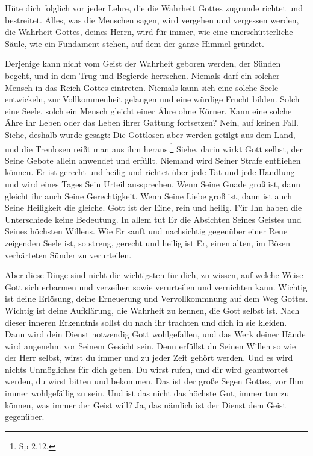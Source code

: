 Hüte dich folglich vor jeder Lehre, die die Wahrheit Gottes zugrunde richtet und bestreitet. Alles, was die Menschen sagen, wird vergehen und vergessen werden, die Wahrheit Gottes, deines Herrn, wird für immer, wie eine unerschütterliche Säule, wie ein Fundament stehen, auf dem der ganze Himmel gründet. 

Derjenige kann nicht vom Geist der Wahrheit geboren werden, der Sünden begeht, und in dem Trug und Begierde herrschen. Niemals darf ein solcher Mensch in das Reich Gottes eintreten. Niemals kann sich eine solche Seele entwickeln, zur Vollkommenheit gelangen und eine würdige Frucht bilden. Solch eine Seele, solch ein Mensch gleicht einer Ähre ohne Körner. Kann eine solche Ähre ihr Leben oder das Leben ihrer Gattung fortsetzen? Nein, auf keinen Fall. Siehe, deshalb wurde gesagt: Die Gottlosen aber werden getilgt aus dem Land, und die Treulosen reißt man aus ihm heraus.\footnote{Sp 2,12.} Siehe, darin wirkt Gott selbst, der Seine Gebote allein anwendet und erfüllt. Niemand wird Seiner Strafe entfliehen können. Er ist gerecht und heilig und richtet über jede Tat und jede Handlung und wird eines Tages Sein Urteil aussprechen. Wenn Seine Gnade groß ist, dann gleicht ihr auch Seine Gerechtigkeit. Wenn Seine Liebe groß ist, dann ist auch Seine Heiligkeit die gleiche. Gott ist der Eine, rein und heilig. Für Ihn haben die Unterschiede keine Bedeutung. In allem tut Er die Absichten Seines Geistes und Seines höchsten Willens. Wie Er sanft und nachsichtig gegenüber einer Reue zeigenden Seele ist, so streng, gerecht und heilig ist Er, einen alten, im Bösen verhärteten Sünder zu verurteilen. 

Aber diese Dinge sind nicht die wichtigsten für dich, zu wissen, auf welche Weise Gott sich erbarmen und verzeihen sowie verurteilen und vernichten kann. Wichtig ist deine Erlösung, deine Erneuerung und Vervollkommnung auf dem Weg Gottes. Wichtig ist deine Aufklärung, die Wahrheit zu kennen, die Gott selbst ist. Nach dieser inneren Erkenntnis sollst du nach ihr trachten und dich in sie kleiden. Dann wird dein Dienst notwendig Gott wohlgefallen, und das Werk deiner Hände wird angenehm vor Seinem Gesicht sein. Denn erfüllst du Seinen Willen so wie der Herr selbst, wirst du immer und zu jeder Zeit gehört werden. Und es wird nichts Unmögliches für dich geben. Du wirst rufen, und dir wird geantwortet werden, du wirst bitten und bekommen. Das ist der große Segen Gottes, vor Ihm immer wohlgefällig zu sein. Und ist das nicht das höchste Gut, immer tun zu können, was immer der Geist will? Ja, das nämlich ist der Dienst dem Geist gegenüber. 

